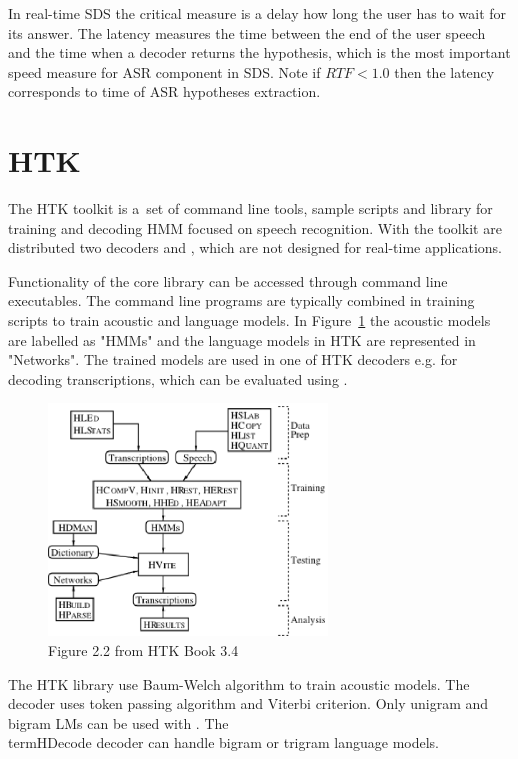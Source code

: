 In real-time \ac{SDS} the critical measure is a delay how long the user has to wait for its answer.
The latency measures the time between the end of the user speech and the time when a decoder returns the hypothesis, which is the most important speed measure for \ac{ASR} component in \ac{SDS}.
Note if $RTF < 1.0$ then the latency corresponds to time of \ac{ASR} hypotheses extraction.


\section{\ac{HTK}}
\label{sec:back_htk}
The \ac{HTK} toolkit is a~set of command line tools, sample scripts and library for training and decoding \ac{HMM} focused on speech recognition.
With the toolkit are distributed two decoders  and , which are not designed for real-time applications.

Functionality of the core library can be accessed through command line executables.
The command line programs are typically combined in training scripts to train acoustic and language models.
In Figure~\ref{fig:htk_tools} the acoustic models are labelled as "HMMs" and the language models in \ac{HTK} are represented in "Networks".
The trained models are used in one of \ac{HTK} decoders e.g.  for decoding transcriptions, which can be evaluated using .

\begin{figure}[!htp]
    \begin{center}
    \includegraphics[width=20em]{images/htk_tools.ps}
    \caption{Figure 2.2 from HTK Book 3.4\cite{young2006htk}}
    \label{fig:htk_tools} 
    \end{center}
\end{figure}

The \ac{HTK} library use Baum-Welch algorithm to train acoustic models.
The  decoder uses token passing algorithm and Viterbi criterion.\cite{young2006htk} %
Only unigram and bigram \acp{LM} can be used with .
The \\term{HDecode} decoder can handle bigram or trigram language models. 


